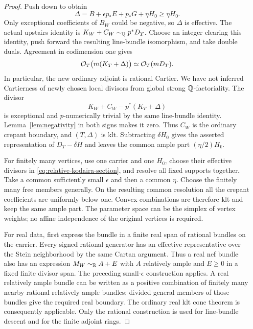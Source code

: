 \begin{proof}
Push down to obtain
\[
 \Delta=B+\epsilon p_*E+p_*G+\eta H_0\geq\eta H_0.
\]
Only exceptional coefficients of $B_W$ could be negative, so
$\Delta$ is effective.  The actual upstairs identity is
$K_W+C_W\sim_{\mathbb Q} p^*D_T$.  Choose an integer clearing this identity,
push forward the resulting line-bundle isomorphism, and take double
duals.  Agreement in codimension one gives
\begin{equation}\label{eq:replacement-cartier}
 \mathcal O_T\bigl(m(K_T+\Delta)\bigr)\simeq\mathcal O_T(mD_T).
\end{equation}
In particular, the new ordinary adjoint is rational Cartier.  We have
not inferred Cartierness of newly chosen local divisors from global
strong $\mathbb Q$-factoriality.  The divisor
\[
 K_W+C_W-p^*(K_T+\Delta)
\]
is exceptional and $p$-numerically trivial by the same line-bundle
identity.  Lemma~\ref{lem:negativity} in both signs makes it zero.
Thus $C_W$ is the ordinary crepant boundary, and $(T,\Delta)$ is klt.
Subtracting $\delta H_0$ gives the asserted representation of
$D_T-\delta H$ and leaves the common ample part $(\eta/2)H_0$.

For finitely many vertices, use one carrier and one $H_0$, choose their
effective divisors in \eqref{eq:relative-kodaira-section}, and resolve
all fixed supports together.  Take a common sufficiently small
$\epsilon$ and then a common $\eta$.  Choose the finitely many free
members generally.  On the resulting common resolution all the
crepant coefficients are uniformly below one.  Convex combinations
are therefore klt and keep the same ample part.  The parameter space
can be the simplex of vertex weights; no affine independence of the
original vertices is required.

For real data, first express the bundle in a finite real span of
rational bundles on the carrier.  Every signed rational generator has
an effective representative over the Stein neighborhood by the same
Cartan argument.  Thus a real nef bundle also has an expression
$M_W\sim_{\mathbb R}A+E$ with $A$ relatively ample and $E\geq0$ in a fixed
finite divisor span.  The preceding small-$\epsilon$ construction
applies.  A real relatively ample bundle can be written as a positive
combination of finitely many nearby rational relatively ample bundles;
divided general members of those bundles give the required real
boundary.  The ordinary real klt cone theorem is consequently
applicable.  Only the rational construction is used for line-bundle
descent and for the finite adjoint rings.
\end{proof}

